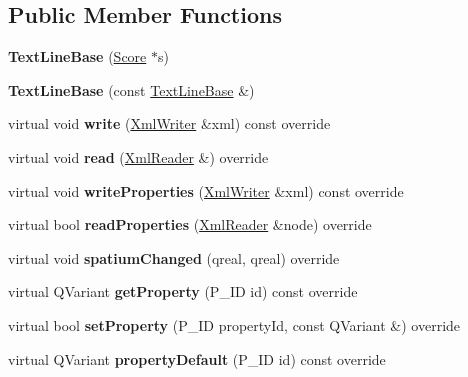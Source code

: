 \subsection*{Public Member Functions}
\begin{DoxyCompactItemize}
\item 
\mbox{\label{class_ms_1_1_text_line_base_af07c685cbc3a5911905e3c3e9e9a5c5b}} 
{\bfseries Text\+Line\+Base} (\hyperlink{class_ms_1_1_score}{Score} $\ast$s)
\item 
\mbox{\label{class_ms_1_1_text_line_base_ac93d14fa9a45b5cd7eb12a954c90e81c}} 
{\bfseries Text\+Line\+Base} (const \hyperlink{class_ms_1_1_text_line_base}{Text\+Line\+Base} \&)
\item 
\mbox{\label{class_ms_1_1_text_line_base_ae0eb6a4f13e54627abed23025a6c3896}} 
virtual void {\bfseries write} (\hyperlink{class_ms_1_1_xml_writer}{Xml\+Writer} \&xml) const override
\item 
\mbox{\label{class_ms_1_1_text_line_base_a2e527bba688bd0e6d2dfeaadedfbbb8a}} 
virtual void {\bfseries read} (\hyperlink{class_ms_1_1_xml_reader}{Xml\+Reader} \&) override
\item 
\mbox{\label{class_ms_1_1_text_line_base_a00ac1fbbce4525ae95c195a5710ccae5}} 
virtual void {\bfseries write\+Properties} (\hyperlink{class_ms_1_1_xml_writer}{Xml\+Writer} \&xml) const override
\item 
\mbox{\label{class_ms_1_1_text_line_base_aaaa9d306bbe5b237b55ee0cafb085ed4}} 
virtual bool {\bfseries read\+Properties} (\hyperlink{class_ms_1_1_xml_reader}{Xml\+Reader} \&node) override
\item 
\mbox{\label{class_ms_1_1_text_line_base_a8bcddb917654e2dff2384dbdd79238b7}} 
virtual void {\bfseries spatium\+Changed} (qreal, qreal) override
\item 
\mbox{\label{class_ms_1_1_text_line_base_a89a6923ed6316afa31b1242836b94789}} 
virtual Q\+Variant {\bfseries get\+Property} (P\+\_\+\+ID id) const override
\item 
\mbox{\label{class_ms_1_1_text_line_base_a4253075b838cb7cbc53b88aa746bd73c}} 
virtual bool {\bfseries set\+Property} (P\+\_\+\+ID property\+Id, const Q\+Variant \&) override
\item 
\mbox{\label{class_ms_1_1_text_line_base_a58c30ac29b22b319959876c125f17b12}} 
virtual Q\+Variant {\bfseries property\+Default} (P\+\_\+\+ID id) const override
\end{DoxyCompactItemize}
